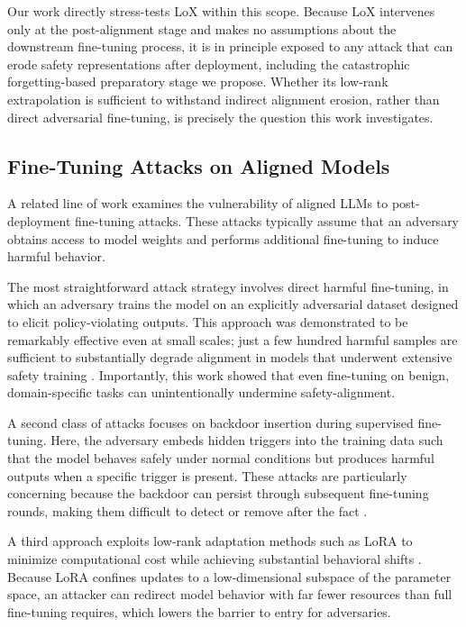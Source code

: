 \documentclass[letterpaper,twocolumn,10pt]{article}
\begin{document}
Our work directly stress-tests LoX within this scope. Because LoX intervenes only at the post-alignment stage and makes no assumptions about the downstream fine-tuning process, it is in principle exposed to any attack that can erode safety representations after deployment, including the catastrophic forgetting-based preparatory stage we propose. Whether its low-rank extrapolation is sufficient to withstand indirect alignment erosion, rather than direct adversarial fine-tuning, is precisely the question this work investigates.

\subsection{Fine-Tuning Attacks on Aligned Models}

A related line of work examines the vulnerability of aligned LLMs to post-deployment fine-tuning attacks. These attacks typically assume that an adversary obtains access to model weights and performs additional fine-tuning to induce harmful behavior. 

The most straightforward attack strategy involves direct harmful fine-tuning, in which an adversary trains the model on an explicitly adversarial dataset designed to elicit policy-violating outputs. This approach was demonstrated to be remarkably effective even at small scales; just a few hundred harmful samples are sufficient to substantially degrade alignment in models that underwent extensive safety training \cite{huang2024harmfulfinetuningattacksdefenses}. Importantly, this work showed that even fine-tuning on benign, domain-specific tasks can unintentionally undermine safety-alignment. 

A second class of attacks focuses on backdoor insertion during supervised fine-tuning. Here, the adversary embeds hidden triggers into the training data such that the model behaves safely under normal conditions but produces harmful outputs when a specific trigger is present. These attacks are particularly concerning because the backdoor can persist through subsequent fine-tuning rounds, making them difficult to detect or remove after the fact \cite{cui2025persistentbackdoorattackscontinual}.

A third approach exploits low-rank adaptation methods such as LoRA to minimize computational cost while achieving substantial behavioral shifts \cite{ran2025loraleakmembershipinferenceattacks}. Because LoRA confines updates to a low-dimensional subspace of the parameter space, an attacker can redirect model behavior with far fewer resources than full fine-tuning requires, which lowers the barrier to entry for adversaries.
\end{document}
